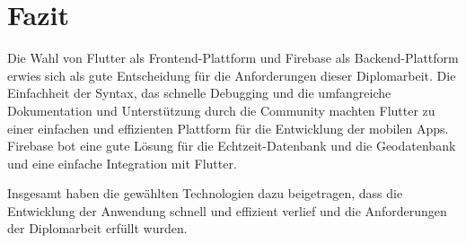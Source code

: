 \section{Fazit}

Die Wahl von Flutter als Frontend-Plattform und Firebase als Backend-Plattform erwies sich als gute Entscheidung für die Anforderungen dieser Diplomarbeit. Die Einfachheit der Syntax, das schnelle Debugging und die umfangreiche Dokumentation und Unterstützung durch die Community machten Flutter zu einer einfachen und effizienten Plattform für die Entwicklung der mobilen Apps. Firebase bot eine gute Lösung für die Echtzeit-Datenbank und die Geodatenbank und eine einfache Integration mit Flutter.

Insgesamt haben die gewählten Technologien dazu beigetragen, dass die Entwicklung der Anwendung schnell und effizient verlief und die Anforderungen der Diplomarbeit erfüllt wurden.

